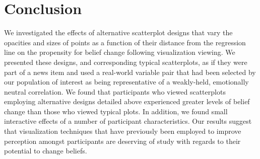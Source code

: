 \documentclass[manuscript,screen,review,anonymous]{acmart}
\begin{document}
\section{Conclusion}\label{sec-conclusion}

We investigated the effects of alternative scatterplot designs that vary
the opacities and sizes of points as a function of their distance from
the regression line on the propensity for belief change following
visualization viewing. We presented these designs, and corresponding
typical scatterplots, as if they were part of a news item and used a
real-world variable pair that had been selected by our population of
interest as being representative of a weakly-held, emotionally neutral
correlation. We found that participants who viewed scatterplots
employing alternative designs detailed above experienced greater levels
of belief change than those who viewed typical plots. In addition, we
found small interactive effects of a number of participant
characteristics. Our results suggest that visualization techniques that
have previously been employed to improve perception amongst participants
are deserving of study with regards to their potential to change
beliefs.




\end{document}
